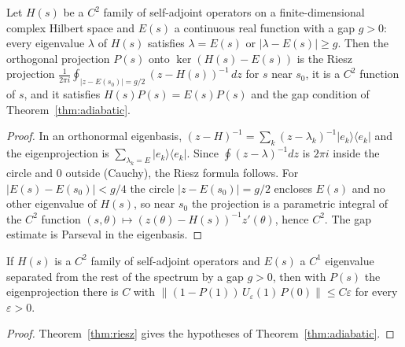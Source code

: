 \begin{theorem}\label{thm:riesz}
  \leanok
  Let $H(s)$ be a $C^2$ family of self-adjoint operators on a finite-dimensional complex Hilbert space and $E(s)$ a
  continuous real function with a gap $g>0$: every eigenvalue $\lambda$ of $H(s)$ satisfies $\lambda=E(s)$ or
  $|\lambda-E(s)|\ge g$. Then the orthogonal projection $P(s)$ onto $\ker(H(s)-E(s))$ is the Riesz projection
  $\frac1{2\pi i}\oint_{|z-E(s_0)|=g/2}(z-H(s))^{-1}\,dz$ for $s$ near $s_0$, it is a $C^2$ function of $s$, and it satisfies
  $H(s)P(s)=E(s)P(s)$ and the gap condition of Theorem~\ref{thm:adiabatic}.
\end{theorem}
\begin{proof}\leanok
  In an orthonormal eigenbasis, $(z-H)^{-1}=\sum_k(z-\lambda_k)^{-1}|e_k\rangle\langle e_k|$ and the eigenprojection is
  $\sum_{\lambda_k=E}|e_k\rangle\langle e_k|$. Since $\oint(z-\lambda)^{-1}dz$ is $2\pi i$ inside the circle and $0$ outside (Cauchy),
  the Riesz formula follows. For $|E(s)-E(s_0)|<g/4$ the circle $|z-E(s_0)|=g/2$ encloses $E(s)$ and no other eigenvalue
  of $H(s)$, so near $s_0$ the projection is a parametric integral of the $C^2$ function $(s,\theta)\mapsto
  (z(\theta)-H(s))^{-1}z'(\theta)$, hence $C^2$. The gap estimate is Parseval in the eigenbasis.
\end{proof}

\begin{corollary}\label{cor:adiabatic}
  \leanok
  If $H(s)$ is a $C^2$ family of self-adjoint operators and $E(s)$ a $C^1$ eigenvalue separated from the rest of the
  spectrum by a gap $g>0$, then with $P(s)$ the eigenprojection there is $C$ with
  $\|(1-P(1))\,U_\varepsilon(1)\,P(0)\|\le C\varepsilon$ for every $\varepsilon>0$.
\end{corollary}
\begin{proof}\leanok
  Theorem~\ref{thm:riesz} gives the hypotheses of Theorem~\ref{thm:adiabatic}.
\end{proof}

